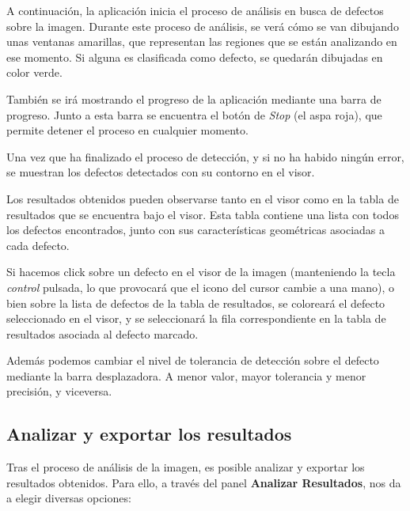 
A continuación, la aplicación inicia el proceso de análisis en busca de defectos sobre la imagen. Durante este proceso de análisis, se verá cómo se van dibujando unas ventanas amarillas, que representan las regiones que se están analizando en ese momento. Si alguna es clasificada como defecto, se quedarán dibujadas en color verde.


También se irá mostrando el progreso de la aplicación mediante una barra de progreso. Junto a esta barra se encuentra el botón de \textit{Stop} (el aspa roja), que permite detener el proceso en cualquier momento.

Una vez que ha finalizado el proceso de detección, y si no ha habido ningún error, se muestran los defectos detectados con su contorno en el visor.


Los resultados obtenidos pueden observarse tanto en el visor como en la tabla de resultados que se encuentra bajo el visor. Esta tabla contiene una lista con todos los defectos encontrados, junto con sus características geométricas asociadas a cada defecto.

Si hacemos click sobre un defecto en el visor de la imagen (manteniendo la tecla \textit{control} pulsada, lo que provocará que el icono del cursor cambie a una mano), o bien sobre la lista de defectos de la tabla de resultados, se coloreará el defecto seleccionado en el visor, y se seleccionará la fila correspondiente en la tabla de resultados asociada al defecto marcado.


Además podemos cambiar el nivel de tolerancia de detección sobre el defecto mediante la barra desplazadora. A menor valor, mayor tolerancia y menor precisión, y viceversa.

\subsection{Analizar y exportar los resultados}
Tras el proceso de análisis de la imagen, es posible analizar y exportar los resultados obtenidos. Para ello, a través del panel \textbf{Analizar Resultados}, nos da a elegir diversas opciones:

